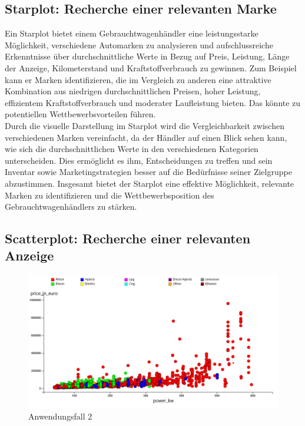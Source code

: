 \subsection{Starplot: Recherche einer relevanten Marke }

Ein Starplot bietet einem Gebrauchtwagenhändler eine leistungsstarke Möglichkeit, verschiedene Automarken zu analysieren und aufschlussreiche Erkenntnisse über durchschnittliche Werte in Bezug auf Preis, Leistung, Länge der Anzeige, Kilometerstand und Kraftstoffverbrauch zu gewinnen.  Zum Beispiel kann er Marken identifizieren, die im Vergleich zu anderen eine attraktive Kombination aus niedrigen durchschnittlichen Preisen, hoher Leistung, effizientem Kraftstoffverbrauch und moderater Laufleistung bieten. Das könnte zu potentiellen Wettbewerbsvorteilen führen. \\

Durch die visuelle Darstellung im Starplot wird die Vergleichbarkeit zwischen verschiedenen Marken vereinfacht, da der Händler auf einen Blick sehen kann, wie sich die durchschnittlichen Werte in den verschiedenen Kategorien unterscheiden. Dies ermöglicht es ihm,  Entscheidungen zu treffen und sein Inventar sowie Marketingstrategien besser auf die Bedürfnisse seiner Zielgruppe abzustimmen. Insgesamt bietet der Starplot eine effektive Möglichkeit, relevante Marken zu identifizieren und die Wettbewerbsposition des Gebrauchtwagenhändlers zu stärken. \\

\subsection{Scatterplot: Recherche einer relevanten Anzeige }

\begin{figure}[H]
    \centering
    \includegraphics{img/anwendung2.png}
    \caption{Anwendungsfall 2}
    \label{fig:aw2}
\end{figure}

